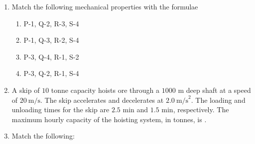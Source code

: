 \documentclass[journal]{IEEEtran}
\begin{document}
\begin{enumerate}
\begin{enumerate}
\end{enumerate}
\hfill{}

\item Match the following mechanical properties with the formulae

\begin{center}
\begin{minipage}{0.45\linewidth}
\centering
\renewcommand{\arraystretch}{1.2}

\end{minipage}\hfill
\begin{minipage}{0.45\linewidth}
\centering
\renewcommand{\arraystretch}{1.2}

\end{minipage}
\end{center}

\begin{enumerate}
\item P-1, Q-2, R-3, S-4
    \item P-1, Q-3, R-2, S-4
    \item P-3, Q-4, R-1, S-2
    \item P-3, Q-2, R-1, S-4
\end{enumerate}
\hfill{}

\item A skip of $10$ tonne capacity hoists ore through a $1000$ m deep shaft at a speed of $20\ \text{m/s}$. 
The skip accelerates and decelerates at $2.0\ \text{m/s}^2$. The loading and unloading times for the skip are 
$2.5$ min and $1.5$ min, respectively. The maximum hourly capacity of the hoisting system, in tonnes, is 
\underline{\hspace{2.5cm}}.
\hfill{}
\newpage
\item Match the following:

\begin{center}
\begin{minipage}{0.45\linewidth}
\centering
\renewcommand{\arraystretch}{1.2}

\end{minipage}\hfill
\begin{minipage}{0.45\linewidth}
\centering
\renewcommand{\arraystretch}{1.2}

\end{minipage}
\end{center}


\end{enumerate}
\end{document}
